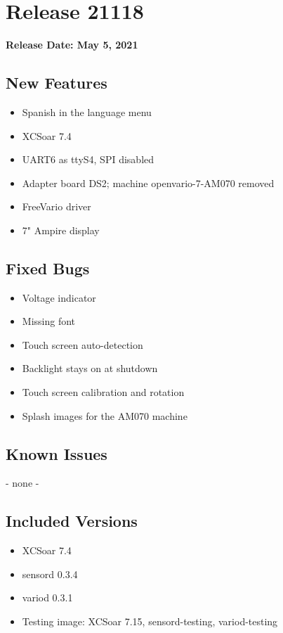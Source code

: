 \chapter*{Release 21118}

\begin{flushleft}
	\textbf{Release Date: May 5, 2021}
\end{flushleft}

\section*{New Features}

\begin{itemize}
	\item Spanish in the language menu
	\item XCSoar 7.4
	\item UART6 as ttyS4, SPI disabled
	\item Adapter board DS2; machine openvario-7-AM070 removed
	\item FreeVario driver
	\item 7" Ampire display
\end{itemize}

\section*{Fixed Bugs}
\begin{itemize}
	\item Voltage indicator
	\item Missing font
	\item Touch screen auto-detection
	\item Backlight stays on at shutdown
	\item Touch screen calibration and rotation
	\item Splash images for the AM070 machine
\end{itemize}

\section*{Known Issues}
	- none -

\section*{Included Versions}

\begin{itemize}
	\item XCSoar 7.4
	\item sensord 0.3.4
	\item variod 0.3.1
	\item Testing image: XCSoar 7.15, sensord-testing, variod-testing
\end{itemize}
